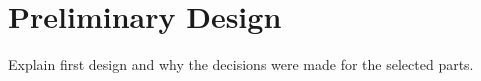 \chapter{Preliminary Design}
Explain first design and why the decisions were made for the selected parts.